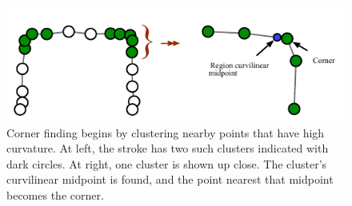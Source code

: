 \begin{figure}[h]
  \centering
  \includegraphics[width=0.8\linewidth]{img/clusters-curvature.pdf}
  \caption[Curvature clusters and corners]{Corner finding begins by
    clustering nearby points that have high curvature. At left, the
    stroke has two such clusters indicated with dark circles. At
    right, one cluster is shown up close. The cluster's curvilinear
    midpoint is found, and the point nearest that midpoint becomes the
    corner.}
  \label{fig:corner-finding}
\end{figure}
